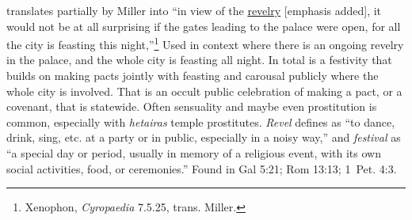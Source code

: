 translates partially by Miller into ``in view of the \underline{revelry} [emphasis added], it would not be at all surprising if the gates leading to the palace were open, for all the city is feasting this night,''\footnote{Xenophon, \emph{Cyropaedia} 7.5.25, trans. Miller.}
Used in context where there is an ongoing revelry in the palace, and the whole city is feasting all night. 
In total  is a festivity that builds on making pacts jointly with feasting and carousal publicly where the whole city is involved. That is an occult public celebration of making a pact, or a covenant, that is statewide. Often sensuality and maybe even prostitution is common, especially with \emph{hetairas} temple prostitutes. \emph{Revel} defines as ``to dance, drink, sing, etc. at a party or in public, especially in a noisy way,'' and \emph{festival} as ``a special day or period, usually in memory of a religious event, with its own social activities, food, or ceremonies.''
Found in Gal 5:21; Rom 13:13; 1~Pet. 4:3.
